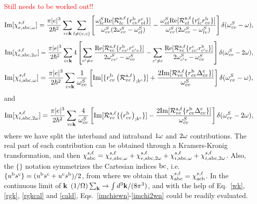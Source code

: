 \documentclass[floatfix,prb,aps,superscriptaddress,11pt,preprint]{revtex4}
\begin{document}
\textcolor{red}{Still needs to be worked out!!}
\begin{equation}\label{imchiewn}
\mathrm{Im}[\chi_{e,\mathrm{a}\mathrm{b}\mathrm{c},\omega}^{s,\ell}]
=
\frac{\pi |e|^3}{2\hbar^2} 
\sum_{vc\mathbf{k}}
\sum_{l\neq(v,c)}
\left[
\frac{\omega^S_{lc}\mathrm{Re}[{\cal R}^{\mathrm{a},\ell}_{lc}\{r^{\mathrm{b}}_{cv}r^{\mathrm{c}}_{vl}\}]}
{\omega^S_{cv}(2\omega^S_{cv}-\omega^S_{cl})}
-
\frac{\omega^S_{vl}\mathrm{Re}[{\cal R}^{\mathrm{a},\ell}_{vl}\{r^{\mathrm{c}}_{lc}r^{\mathrm{b}}_{cv}\}]}
{\omega^S_{cv}(2\omega^S_{cv}-\omega^S_{lv})}
\right]
\delta(\omega^S_{cv}-\omega)
,
\end{equation}  
\begin{equation}\label{imchie2wn}
\mathrm{Im}[\chi_{e,\mathrm{a}\mathrm{b}\mathrm{c},2\omega}^{s,\ell}]
=
\frac{\pi |e|^3}{2\hbar^2} 
\sum_{vc\mathbf{k}}
4
\left[
\sum_{v'\ne v}
\frac{\mathrm{Re}[{\cal
    R}^{\mathrm{a},\ell}_{vc}\{r^{\mathrm{b}}_{cv'}r^{\mathrm{c}}_{v'v}\}]}{2\omega^S_{cv'}-\omega^S_{cv}}
-
\sum_{c'\ne c}
\frac{\mathrm{Re}[{\cal R}^{\mathrm{a},\ell}_{vc}\{r^{\mathrm{c}}_{cc'}r^{\mathrm{b}}_{c'v}\}]}
{2\omega^S_{c'v}-\omega^S_{cv}}
\right]
\delta(\omega^S_{cv}-2\omega)
,
\end{equation}
\begin{equation}\label{imchiwn}
\mathrm{Im}[\chi_{i,\mathrm{a}\mathrm{b}\mathrm{c},\omega}^{s,\ell}]
=
\frac{\pi|e|^3}{2\hbar^2}
\sum_{cv\mathbf{k}}
\frac{1}{\omega^S_{cv}}
\left[
\mathrm{Im}[\{r^{\mathrm{b}}_{cv}\left({\cal R}^{\mathrm{a},\ell}_{vc}\right)_{;k^{\mathrm{c}}}\}]
+
\frac{2\mathrm{Im}[{\cal R}^{\mathrm{a},\ell}_{vc}\{r^{\mathrm{b}}_{cv}\Delta^{\mathrm{c}}_{cv}\}]}{\omega^S_{cv}}
\right]
\delta(\omega^S_{cv}-\omega)
,
\end{equation}
and
\begin{equation}\label{imchi2wn}
\mathrm{Im}[\chi_{i,\mathrm{a}\mathrm{b}\mathrm{c},2\omega}^{s,\ell}]
=
\frac{\pi|e|^3}{2\hbar^2}\sum_{vc\mathbf{k}}
\frac{4}{\omega^S_{cv}}
\left[
\mathrm{Im}[{\cal R}^{\mathrm{a},\ell}_{vc}\{\left(r^{\mathrm{b}}_{cv}\right)_{;k^{\mathrm{c}}}\}]
-
\frac{2\mathrm{Im}[{\cal R}^{\mathrm{a},\ell}_{vc}\{r^{\mathrm{b}}_{cv}\Delta^{\mathrm{c}}_{cv}\}]}{\omega^S_{cv}}
\right]\delta(\omega^S_{cv}-2\omega)
,
\end{equation}
where we have split the interband and intraband $1\omega$ and $2\omega$
contributions. The real part of each contribution can be obtained through
a Kramers-Kronig transformation, and then
$\chi^{s,\ell}_{\mathrm{a}\mathrm{b}\mathrm{c}}=\chi^{s,\ell}_{e,\mathrm{a}\mathrm{b}\mathrm{c},\omega}+\chi^{s,\ell}_{e,\mathrm{a}\mathrm{b}\mathrm{c},2\omega}+\chi^{s,\ell}_{i,\mathrm{a}\mathrm{b}\mathrm{c},\omega}+\chi^{s,\ell}_{i,\mathrm{a}\mathrm{b}\mathrm{c},2\omega}
$. Also,
the
$\{\}$ notation symmetrizes the Cartesian indices $\mathrm{b}\mathrm{c}$, i.e. 
$\{u^{\mathrm{b}}s^{\mathrm{c}}\}=(u^{\mathrm{b}}s^{\mathrm{c}}+u^{\mathrm{c}}s^{\mathrm{b}})/2$,
from where we obtain that
$\chi_{\mathrm{a}\mathrm{b}\mathrm{c}}^{s,\ell}=\chi_{\mathrm{a}\mathrm{c}\mathrm{b}}^{s,\ell}$.
In the continuous limit of $\mathbf{k}$ 
$(1/\Omega)\sum_{\mathbf{k}}\to\int d^3\mathbf{k}/(8\pi^3)$, and with the help of 
Eq.~\eqref{wk}, \eqref{rgk}, \eqref{rgkcal} and \eqref{cald}, 
Eqs.~\eqref{imchiewn}-\eqref{imchi2wn} could be
readily evaluated.
\end{document}

